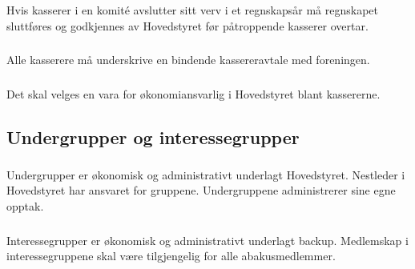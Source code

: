\subsubsection{}
Hvis kasserer i en komité avslutter sitt verv i et regnskapsår må regnskapet
sluttføres og godkjennes av Hovedstyret før påtroppende kasserer overtar.

\subsubsection{}
Alle kasserere må underskrive en bindende kassereravtale med foreningen.

\subsubsection{}
Det skal velges en vara for økonomiansvarlig i Hovedstyret blant kassererne.

\subsection{Undergrupper og interessegrupper}

\subsubsection{}
Undergrupper er økonomisk og administrativt underlagt Hovedstyret. Nestleder i
Hovedstyret har ansvaret for gruppene. Undergruppene administrerer sine egne
opptak.

\subsubsection{}
Interessegrupper er økonomisk og administrativt underlagt backup. Medlemskap i
interessegruppene skal være tilgjengelig for alle abakusmedlemmer.
